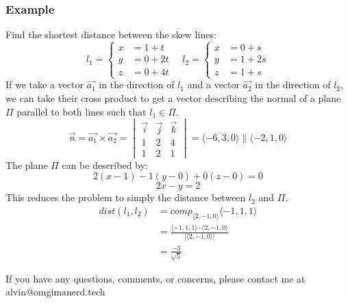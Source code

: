 \documentclass{math}
\begin{document}
\subsubsection*{Example}
Find the shortest distance between the skew lines:
\[ l_1 = \begin{cases}
  x &= 1+t \\
  y &= 0+2t \\
  z &= 0+4t
\end{cases} \quad l_2 = \begin{cases}
  x &= 0+s \\
  y &= 1+2s \\
  z &= 1+s
\end{cases} \]
If we take a vector \( \vec{a_1} \) in the direction of \( l_1 \) and a vector
\( \vec{a_2} \) in the direction of \( l_2 \), we can take their cross product
to get a vector describing the normal of a plane \( \Pi \) parallel to both
lines such that \( l_1\in\Pi \).
\[ \vec{n} = \vec{a_1}\times\vec{a_2} = \begin{vmatrix}
  \vec{i} & \vec{j} & \vec{k} \\
  1 & 2 & 4 \\
  1 & 2 & 1
\end{vmatrix} = \langle-6,3,0\rangle\parallel\langle-2,1,0\rangle \]
The plane \( \Pi \) can be described by:
\[ 2(x-1)-1(y-0)+0(z-0) = 0 \]
\[ 2x-y = 2 \]
This reduces the problem to simply the distance between \( l_2 \) and \( \Pi \).
\begin{align*}
  dist(l_1,l_2) &= comp_{\langle2,-1,0\rangle}\langle-1,1,1\rangle \\
  &= \frac{\langle-1,1,1\rangle\cdot\langle2,-1,0\rangle}
    {|\langle2,-1,0\rangle|} \\
  &= \frac{-3}{\sqrt{5}}
\end{align*}

\begin{center}
  If you have any questions, comments, or concerns, please contact me at
  alvin@omgimanerd.tech
\end{center}
\end{document}
